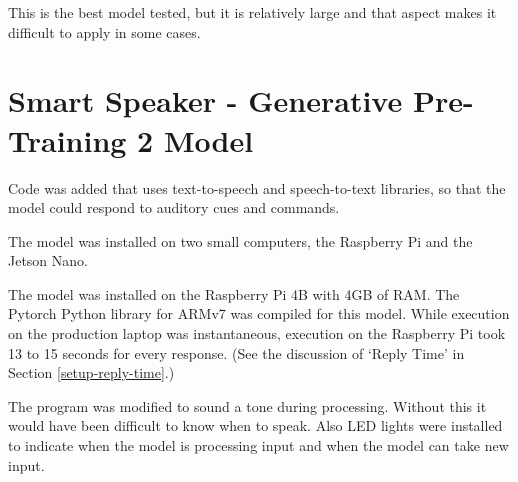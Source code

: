 This is the best model tested, but it is relatively large and that aspect makes it difficult to apply in some cases.

\section{Smart Speaker - Generative Pre-Training 2 Model}

\label{install-gpt2-smart}
Code was added that uses text-to-speech and speech-to-text libraries, so that the model could respond to auditory cues and commands.

The model was installed on two small computers, the Raspberry Pi and the Jetson Nano.%

The model was installed on the Raspberry Pi 4B with 4GB of RAM. The Pytorch Python library for ARMv7 was compiled for this model. 
While execution on the production laptop was instantaneous, execution on the Raspberry Pi took 13 to 15 seconds for every response. (See the discussion of `Reply Time' in Section \ref{setup-reply-time}.)

The program was modified to sound a tone during processing. Without this it would have been difficult to know when to speak. Also LED lights were installed to indicate when the model is processing input and when the model can take new input. %
